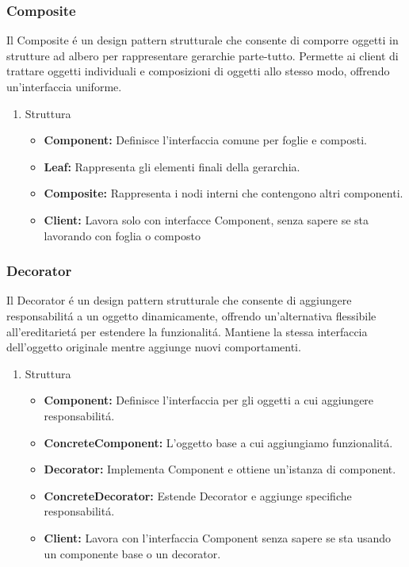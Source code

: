 \documentclass[11pt]{article}
\begin{document}
\subsubsection{Composite}
\label{sec:org2ae985a}
Il Composite é un design pattern strutturale che consente di comporre oggetti in strutture ad albero per rappresentare gerarchie parte-tutto. Permette ai client di trattare oggetti individuali e composizioni di oggetti allo stesso modo, offrendo un'interfaccia uniforme.
\begin{enumerate}
\item Struttura
\label{sec:org2ae0134}
\begin{itemize}
\item \textbf{\textbf{Component:}} Definisce l'interfaccia comune per foglie e composti.
\item \textbf{\textbf{Leaf:}} Rappresenta gli elementi finali della gerarchia.
\item \textbf{\textbf{Composite:}} Rappresenta i nodi interni che contengono altri componenti.
\item \textbf{\textbf{Client:}} Lavora solo con interfacce Component, senza sapere se sta lavorando con foglia o composto
\end{itemize}
\end{enumerate}
\subsubsection{Decorator}
\label{sec:orgd4e0aae}
Il Decorator é un design pattern strutturale che consente di aggiungere responsabilitá a un oggetto dinamicamente, offrendo un'alternativa flessibile all'ereditarietá per estendere la funzionalitá. Mantiene la stessa interfaccia dell'oggetto originale mentre aggiunge nuovi comportamenti.
\begin{enumerate}
\item Struttura
\label{sec:org8793f84}
\begin{itemize}
\item \textbf{\textbf{Component:}} Definisce l'interfaccia per gli oggetti a cui aggiungere responsabilitá.
\item \textbf{\textbf{ConcreteComponent:}} L'oggetto base a cui aggiungiamo funzionalitá.
\item \textbf{\textbf{Decorator:}} Implementa Component e ottiene un'istanza di component.
\item \textbf{\textbf{ConcreteDecorator:}} Estende Decorator e aggiunge specifiche responsabilitá.
\item \textbf{\textbf{Client:}} Lavora con l'interfaccia Component senza sapere se sta usando un componente base o un decorator.
\end{itemize}
\end{enumerate}
\end{document}

